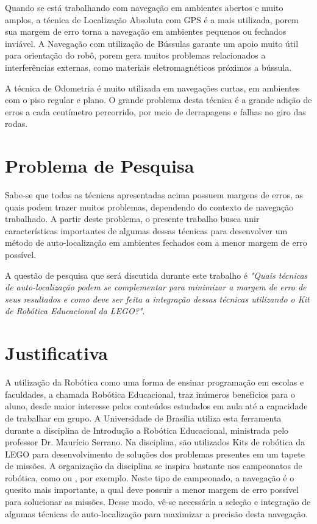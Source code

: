 	Quando se está trabalhando com navegação em ambientes abertos e muito amplos, a técnica de Localização Absoluta com GPS é a mais utilizada, porem sua margem de erro torna a navegação em ambientes pequenos ou fechados inviável. A Navegação com utilização de Bússulas garante um apoio muito útil para orientação do robô, porem gera muitos problemas relacionados a interferências externas, como materiais eletromagnéticos próximos a bússula.
	
	A técnica de Odometria é muito utilizada em navegações curtas, em ambientes com o piso regular e plano. O grande problema desta técnica é a grande adição de erros a cada centímetro percorrido, por meio de derrapagens e falhas no giro das rodas. 

\section{Problema de Pesquisa}

	Sabe-se que todas as técnicas apresentadas acima possuem margens de erros, as quais podem trazer muitos problemas, dependendo do contexto de navegação trabalhado. A partir deste problema, o presente trabalho busca unir características importantes de algumas dessas técnicas para desenvolver um método de auto-localização em ambientes fechados com a menor margem de erro possível.

	A questão de pesquisa que será discutida durante este trabalho é \textit{"Quais técnicas de auto-localização podem se complementar para minimizar a margem de erro de seus resultados e como deve ser feita a integração dessas técnicas utilizando o Kit de Robótica Educacional da LEGO?"}.

\section{Justificativa}

	A utilização da Robótica como uma forma de ensinar programação em escolas e faculdades, a chamada Robótica Educacional, traz inúmeros benefícios para o aluno, desde maior interesse pelos conteúdos estudados em aula até a capacidade de trabalhar em grupo. A Universidade de Brasília utiliza esta ferramenta durante a disciplina de Introdução a Robótica Educacional, ministrada pelo professor Dr. Maurício Serrano. Na disciplina, são utilizados Kits de robótica da LEGO para desenvolvimento de soluções dos problemas presentes em um tapete de missões. A organização da disciplina se inspira bastante nos campeonatos de robótica, como \cite{ciber-rato} ou \cite{roboBulldozerIV}, por exemplo. Neste tipo de campeonado, a navegação é o quesito mais importante, a qual deve possuir a menor margem de erro possível para solucionar as missões. Desse modo, vê-se necessária a seleção e integração de algumas técnicas de auto-localização para maximizar a precisão desta navegação.
	

